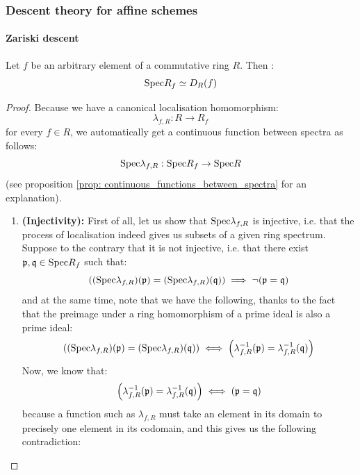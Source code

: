             \subsubsection{Descent theory for affine schemes}
                \paragraph{Zariski descent} 
                    \begin{lemma} \label{lemma: localisations_are_open}
                        Let $f$ be an arbitrary element of a commutative ring $R$. Then :
                            $$\mathrm{Spec} R_f \simeq D_R(f)$$
                    \end{lemma}
                        \begin{proof}
                            Because we have a canonical localisation homomorphism:
                                $$\lambda_{f, R}: R \to R_f$$
                            for every $f \in R$, we automatically get a continuous function between spectra as follows:
                                $$\mathrm{Spec} \lambda_{f, R}: \mathrm{Spec} R_f \to \mathrm{Spec} R$$
                            (see proposition \ref{prop: continuous_functions_between_spectra} for an explanation). 
                                \begin{enumerate}
                                    \item \textbf{(Injectivity):} First of all, let us show that $\mathrm{Spec} \lambda_{f, R}$ is injective, i.e. that the process of localisation indeed gives us subsets of a given ring spectrum. Suppose to the contrary that it is not injective, i.e. that there exist $\mathfrak{p}, \mathfrak{q} \in \mathrm{Spec} R_f$ such that:
                                        $$\left( (\mathrm{Spec} \lambda_{f, R})(\mathfrak{p}) = (\mathrm{Spec} \lambda_{f, R})(\mathfrak{q}) \right) \implies \neg(\mathfrak{p} = \mathfrak{q})$$
                                    and at the same time, note that we have the following, thanks to the fact that the preimage under a ring homomorphism of a prime ideal is also a prime ideal:
                                        $$\left( (\mathrm{Spec} \lambda_{f, R})(\mathfrak{p}) = (\mathrm{Spec} \lambda_{f, R})(\mathfrak{q}) \right) \iff \left(\lambda_{f, R}^{-1}(\mathfrak{p}) = \lambda_{f, R}^{-1}(\mathfrak{q})\right)$$
                                    Now, we know that:
                                        $$\left(\lambda_{f, R}^{-1}(\mathfrak{p}) = \lambda_{f, R}^{-1}(\mathfrak{q})\right) \iff (\mathfrak{p} = \mathfrak{q})$$
                                    because a function such as $\lambda_{f, R}$ must take an element in its domain to precisely one element in its codomain, and this gives us the following contradiction:

\end{enumerate}
\end{proof}
